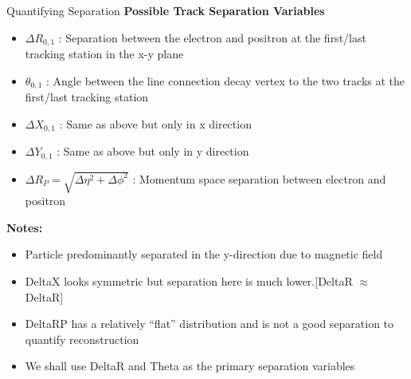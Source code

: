 \begin{frame}{Quantifying  Separation}
	\textbf{Possible Track Separation Variables}
	\begin{itemize}
		\item $\Delta R_{0, 1}$ : Separation between the electron and positron at the first/last tracking station in the x-y plane
		\item $\theta_{0, 1}$ : Angle between the line connection decay vertex to the two tracks at the first/last tracking station
		\item $\Delta X_{0,1}$ : Same as above but only in x direction 
		\item $\Delta Y_{0,1}$ : Same as above but only in y direction
		\item $\Delta R_P = \sqrt{\Delta \eta ^2 + \Delta \phi^2}$  : Momentum space separation between electron and positron
	\end{itemize}

	\textbf{\footnotesize Notes:}
	\begin{itemize}
		\scriptsize
		\item Particle predominantly separated in the y-direction due to magnetic field
		\item DeltaX looks symmetric but separation here is much lower.[DeltaR $\approx$ DeltaR]
		\item DeltaRP has a relatively ``flat'' distribution and is not a good separation to quantify reconstruction
		\item We shall use DeltaR and Theta as the primary separation variables
	\end{itemize}
\end{frame}





